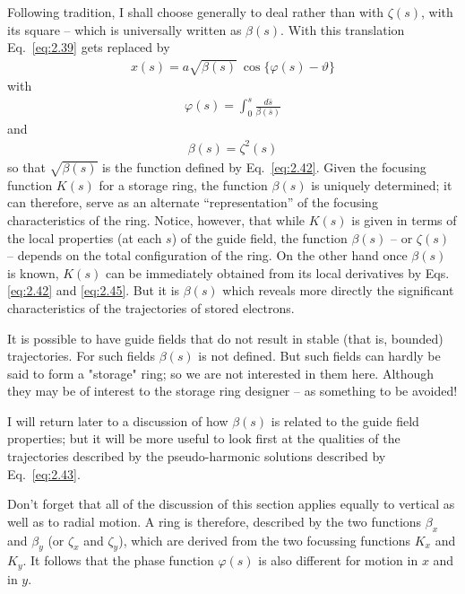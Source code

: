 Following tradition, I shall choose generally to deal rather than with $\zeta(s)$, with its square -- which is universally written as $\beta(s)$. With this translation Eq.~\eqref{eq:2.39} gets replaced by
\begin{align}
	x(s) = a\sqrt{\beta(s)}\ \cos\{\varphi(s)-\vartheta\}\label{eq:2.43}
\end{align}
with
\begin{align}
	\varphi(s) = \int_{0}^{s} \frac{d\bar{s}}{\beta(\bar{s})}\label{eq:2.44}
\end{align}
and
\begin{align}
	\beta(s) = \zeta^2(s)\label{eq:2.45}
\end{align}
so that $\sqrt{\beta(s)}$ is the function defined by Eq.~\eqref{eq:2.42}. Given the focusing function $K(s)$ for a storage ring, the function $\beta(s)$ is uniquely determined; it can therefore, serve as an alternate “representation” of the focusing characteristics of the ring. Notice, however, that while $K(s)$ is given in terms of the local properties (at each $s$) of the guide field, the function
$\beta(s)$ -- or $\zeta(s)$ -- depends on the total configuration of the ring. On the other hand once $\beta(s)$ is known, $K(s)$ can be immediately obtained from its local derivatives by Eqs. \eqref{eq:2.42} and \eqref{eq:2.45}. But it is $\beta(s)$ which reveals more directly the significant characteristics of the trajectories of stored electrons.

It is possible to have guide fields that do not result in stable (that is, bounded) trajectories. For such fields $\beta(s)$ is not defined. But such fields can hardly be said to form a "storage" ring; so we are not interested in them here. Although they may be of interest to the storage ring designer -- as something to be avoided!

I will return later to a discussion of how $\beta(s)$ is related to the guide field properties; but it will be more useful to look first at the qualities of the trajectories described by the pseudo-harmonic solutions described by Eq.~\ref{eq:2.43}. 

Don't forget that all of the discussion of this section applies equally to vertical as well as to radial motion. A ring is therefore, described by the two functions $\beta_x$ and $\beta_y$ (or $\zeta_x$ and $\zeta_y$), which are derived from the two focussing functions $K_x$ and $K_y$. It follows that the phase function $\varphi(s)$ is also different for motion in $x$ and in $y$.